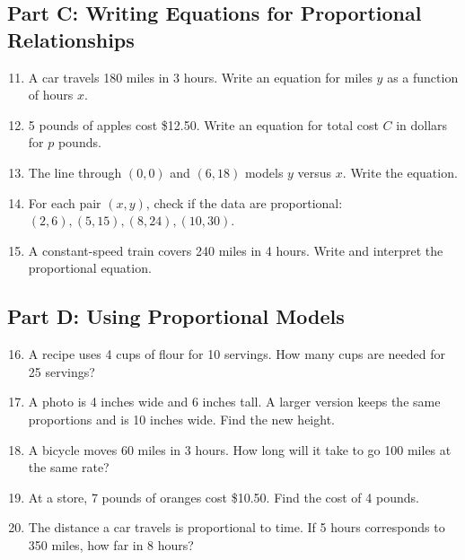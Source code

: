 \documentclass[12pt]{article}
\begin{document}
\subsection*{Part C: Writing Equations for Proportional Relationships}
\begin{enumerate}
  \setcounter{enumi}{10}
  \item A car travels 180 miles in 3 hours. Write an equation for miles \(y\) as a function of hours \(x\).
  \item 5 pounds of apples cost \$12.50. Write an equation for total cost \(C\) in dollars for \(p\) pounds.
  \item The line through \((0,0)\) and \((6,18)\) models \(y\) versus \(x\). Write the equation.
  \item For each pair \((x,y)\), check if the data are proportional:  
  \((2,6), (5,15), (8,24), (10,30)\).
  \item A constant-speed train covers 240 miles in 4 hours. Write and interpret the proportional equation.
\end{enumerate}

\subsection*{Part D: Using Proportional Models}
\begin{enumerate}
  \setcounter{enumi}{15}
  \item A recipe uses 4 cups of flour for 10 servings. How many cups are needed for 25 servings?
  \item A photo is 4 inches wide and 6 inches tall. A larger version keeps the same proportions and is 10 inches wide. Find the new height.
  \item A bicycle moves 60 miles in 3 hours. How long will it take to go 100 miles at the same rate?
  \item At a store, 7 pounds of oranges cost \$10.50. Find the cost of 4 pounds.
  \item The distance a car travels is proportional to time. If 5 hours corresponds to 350 miles, how far in 8 hours?
\end{enumerate}
\end{document}

